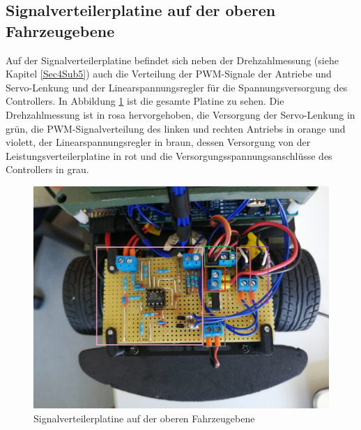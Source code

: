 \newpage
\subsection{Signalverteilerplatine auf der oberen Fahrzeugebene}\label{Sec8Sub2}

Auf der Signalverteilerplatine befindet sich neben der Drehzahlmessung (siehe Kapitel \ref{Sec4Sub5}) auch die Verteilung der PWM-Signale der Antriebe und Servo-Lenkung und der Linearspannungsregler für die Spannungsversorgung des Controllers. In Abbildung \ref{fig:Signalverteilerplatine} ist die gesamte Platine zu sehen. Die Drehzahlmessung ist in rosa hervorgehoben, die Versorgung der Servo-Lenkung in grün, die PWM-Signalverteilung des linken und rechten Antriebs in orange und violett, der Linearspannungsregler in braun, dessen Versorgung von der Leistungsverteilerplatine in rot und die Versorgungsspannungsanschlüsse des Controllers in grau. 


\begin{figure}[H] %
\includegraphics[width=.7\textwidth]{sec8/images/Signalverteilerplatine} 
\centering
\captionsetup{width=.9\textwidth}
\caption[Signalverteilerplatine auf der oberen Fahrzeugebene]{Signalverteilerplatine auf der oberen Fahrzeugebene}
\centering
\label{fig:Signalverteilerplatine}
\end{figure}


\newpage